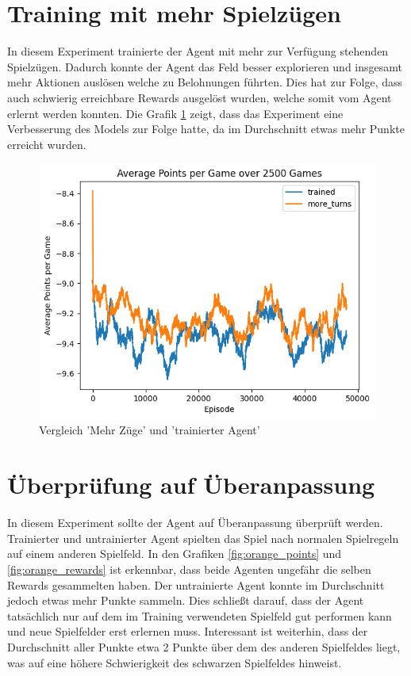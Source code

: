  \newpage
\section{Training mit mehr Spielzügen}

In diesem Experiment trainierte der Agent mit mehr zur Verfügung stehenden Spielzügen. Dadurch konnte der Agent das Feld besser explorieren und insgesamt mehr Aktionen auslösen welche zu Belohnungen führten. Dies hat zur Folge, dass auch schwierig erreichbare Rewards ausgelöst wurden, welche somit vom Agent erlernt werden konnten. 
Die Grafik \ref{fig:turns_points} zeigt, dass das Experiment eine Verbesserung des Models zur Folge hatte, da im Durchschnitt etwas mehr Punkte erreicht wurden.

\begin{figure}[!h]
    \centering
    \includegraphics[scale=0.6]{Bilder/points_more_turns.png}
    \caption{Vergleich 'Mehr Züge' und 'trainierter Agent'}
    \label{fig:turns_points}

\end{figure}

\newpage
\section{Überprüfung auf Überanpassung}
In diesem Experiment sollte der Agent auf Überanpassung überprüft werden. Trainierter und untrainierter Agent spielten das Spiel nach normalen Spielregeln auf einem anderen Spielfeld.
In den Grafiken \ref{fig:orange_points} und \ref{fig:orange_rewards} ist erkennbar, dass beide Agenten ungefähr die selben Rewards gesammelten haben. Der untrainierte Agent konnte im Durchschnitt jedoch etwas mehr Punkte sammeln.
Dies schließt darauf, dass der Agent tatsächlich nur auf dem im Training verwendeten Spielfeld gut performen kann und neue Spielfelder erst erlernen muss.
Interessant ist weiterhin, dass der Durchschnitt aller Punkte etwa 2 Punkte über dem des anderen Spielfeldes liegt, was auf eine höhere Schwierigkeit des schwarzen Spielfeldes hinweist.


